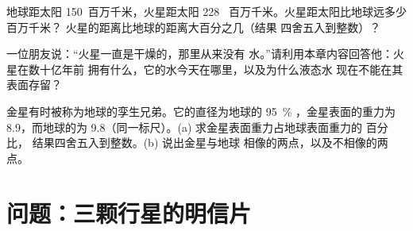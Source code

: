 \begin{exercise}[$\star\star$]\label{exo:g6:earth-a-planet:10}
地球距太阳 150~百万千米，火星距太阳 228~
百万千米。火星距太阳比地球远多少百万千米？
火星的距离比地球的距离大百分之几（结果
四舍五入到整数）？
\end{exercise}

\begin{exercise}[$\star\star\star$]\label{exo:g6:earth-a-planet:11}
一位朋友说：“火星一直是干燥的，那里从来没有
水。”请利用本章内容回答他：火星在数十亿年前
拥有什么，它的水今天在哪里，以及为什么液态水
现在不能在其表面存留？
\end{exercise}

\begin{exercise}[$\star\star\star$]\label{exo:g6:earth-a-planet:12}
金星有时被称为地球的孪生兄弟。它的直径为地球的 95~\%
，金星表面的重力为 8.9，而地球的为
9.8（同一标尺）。(a) 求金星表面重力占地球表面重力的
百分比，
结果四舍五入到整数。(b) 说出金星与地球
相像的两点，以及不相像的两点。
\end{exercise}

\section{问题：三颗行星的明信片}

